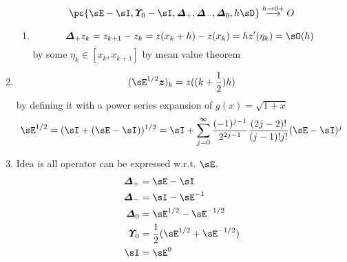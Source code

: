 \documentclass[11pt]{article}
\begin{document}
\begin{enumerate}
    \[
        \pc{\shift-\id, \avg - \id, \forw, \back, \cent, h\diff} \overset{h\to 0+}{\longrightarrow} O
    \]
    \begin{enumerate}
        \item {} 
        \[
            \forw z_k = z_{k+1} - z_k =  z(x_k + h) - z(x_k) = hz'(\eta_k) = \sO(h)
        \]
        by some $\eta_k \in [x_k, x_{k+1}]$ by mean value theorem
    \end{enumerate}
    \item {}
    \[
        (\shift^{1/2} \bz)_k = z((k+\frac{1}{2})h)
    \]
    by defining it with a power series expansion of $g(x) = \sqrt{1+x}$
    \[
        \shift^{1/2} = (\id + (\shift - \id))^{1/2} = \id + \sum_{j=0}^{\infty} \frac{ (-1)^{j-1} }{ 2^{2j - 1} } \frac{(2j - 2)!}{(j-1)!j!}  (\shift - \id)^j
    \]
    \item {} Idea is all operator can be expressed w.r.t. $\shift$. 
    \begin{align*}
        \forw 
            &= \shift - \id \\
        \back
            &= \id - \shift^{-1} \\ 
        \cent
            &= \shift^{1/2} - \shift^{-1/2} \\
        \avg
            &= \frac{1}{2} (\shift^{1/2} + \shift^{-1/2}) \\
        \id
            &= \shift^0
    \end{align*}
\end{enumerate}
\end{document}
